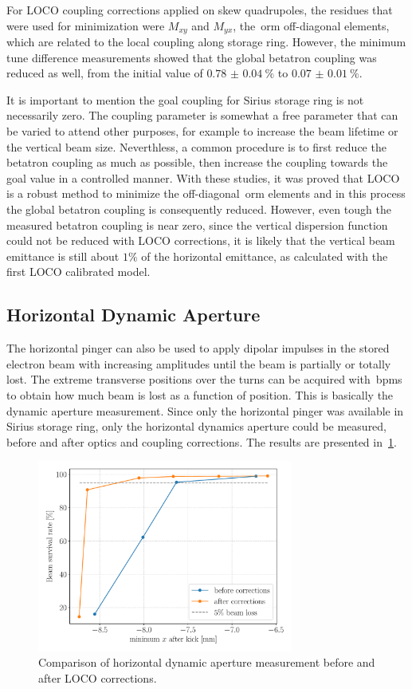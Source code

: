 For LOCO coupling corrections applied on skew quadrupoles, the residues that were used for minimization were $M_{xy}$ and $M_{yx}$, the~\gls{orm} off-diagonal elements, which are related to the local coupling along storage ring. However, the minimum tune difference measurements showed that the global betatron coupling was reduced as well, from the initial value of $\SI{0.78(4)}{\%}$ to $\SI{0.07(1)}{\%}$.

It is important to mention the goal coupling for Sirius storage ring is not necessarily zero. The coupling parameter is somewhat a free parameter that can be varied to attend other purposes, for example to increase the beam lifetime or the vertical beam size. Neverthless, a common procedure is to first reduce the betatron coupling as much as possible, then increase the coupling towards the goal value in a controlled manner. With these studies, it was proved that LOCO is a robust method to minimize the off-diagonal~\gls{orm} elements and in this process the global betatron coupling is consequently reduced. However, even tough the measured betatron coupling is near zero, since the vertical dispersion function could not be reduced with LOCO corrections, it is likely that the vertical beam emittance is still about $1\%$ of the horizontal emittance, as calculated with the first LOCO calibrated model.

\subsection{Horizontal Dynamic Aperture}
The horizontal pinger can also be used to apply dipolar impulses in the stored electron beam with increasing amplitudes until the beam is partially or totally lost. The extreme transverse positions over the turns can be acquired with~\glspl{bpm} to obtain how much beam is lost as a function of position. This is basically the dynamic aperture measurement. Since only the horizontal pinger was available in Sirius storage ring, only the horizontal dynamics aperture could be measured, before and after optics and coupling corrections. The results are presented in~\ref{fig:xdynap}.
\begin{figure}
\centering
\includegraphics[width=0.75\textwidth]{figures/xdynamic_aperture_grid.pdf}
\caption{Comparison of horizontal dynamic aperture measurement before and after LOCO corrections.}
\label{fig:xdynap}
\end{figure}

